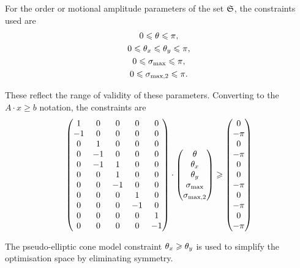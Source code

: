 For the order or motional amplitude parameters of the set $\mathfrak{S}$, the constraints used are
\begin{subequations}
\begin{gather}
    0 \leqslant \theta \leqslant \pi, \\
    0 \leqslant \theta_x \leqslant \theta_y \leqslant \pi, \\
    0 \leqslant \sigma_\textrm{max} \leqslant \pi, \\
    0 \leqslant \sigma_{\textrm{max,2}} \leqslant \pi.
\end{gather}
\end{subequations}

These reflect the range of validity of these parameters.
Converting to the $A \cdot x \geqslant b$ notation, the constraints are
\begin{equation}
    \begin{pmatrix}
        1 & 0 & 0 & 0 & 0 \\
        -1& 0 & 0 & 0 & 0 \\
        0 & 1 & 0 & 0 & 0 \\
        0 &-1 & 0 & 0 & 0 \\
        0 &-1 & 1 & 0 & 0 \\
        0 & 0 & 1 & 0 & 0 \\
        0 & 0 &-1 & 0 & 0 \\
        0 & 0 & 0 & 1 & 0 \\
        0 & 0 & 0 &-1 & 0 \\
        0 & 0 & 0 & 0 & 1 \\
        0 & 0 & 0 & 0 &-1 \\
    \end{pmatrix}
    \cdot
    \begin{pmatrix}
        \theta \\
        \theta_x \\
        \theta_y \\
        \sigma_\textrm{max} \\
        \sigma_{\textrm{max,2}} \\
    \end{pmatrix}
    \geqslant
    \begin{pmatrix}
         0 \\
         -\pi \\
         0 \\
         -\pi \\
         0 \\
         0 \\
         -\pi \\
          0 \\
         -\pi \\
          0 \\
         -\pi \\
    \end{pmatrix}
\end{equation}

The pseudo-elliptic cone model constraint $\theta_x \geqslant \theta_y$ is used to simplify the optimisation space by eliminating symmetry.
